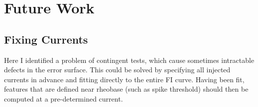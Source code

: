 \section{Future Work}
\subsection{Fixing Currents}
Here I identified a problem of contingent tests, which cause sometimes intractable defects in the error surface.
This could be solved by specifying all injected currents in advance and fitting directly to the entire FI curve.
Having been fit, features that are defined near rheobase (such as spike threshold) should then be computed at a pre-determined current.


